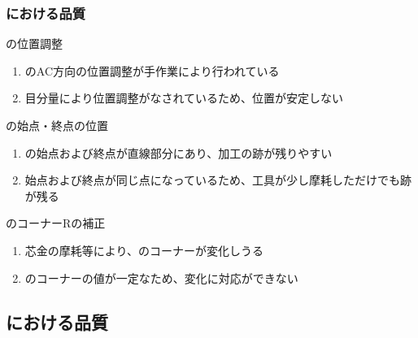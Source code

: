 \subsubsection{\EndFaceInCChamferMilling における品質}

\begin{Issues}{\EndFaceInCChamferMilling の位置調整}
\begin{enumerate}[label=\sarrow]
\item[{\sarrow[red]}]\EndFaceInCChamferMilling のAC方向の位置調整が手作業により行われている
\item[{\sarrow[red]}]目分量により位置調整がなされているため、位置が安定しない
\end{enumerate}
\end{Issues}

\begin{Issues}{\EndFaceInCChamferMilling の始点・終点の位置}
\begin{enumerate}[label=\sarrow]
\item[{\sarrow[red]}]\EndFaceInCChamferMilling の始点および終点が直線部分にあり、加工の跡が残りやすい
\item[{\sarrow[red]}]始点および終点が同じ点になっているため、工具が少し摩耗しただけでも跡が残る
\end{enumerate}
\end{Issues}

\begin{Issues}{\EndFaceInCChamferMilling のコーナーRの補正}
\begin{enumerate}[label=\sarrow]
\item{}芯金の摩耗等により、\EndFaceInCChamfer のコーナーが変化しうる
\item[{\sarrow[red]}]\EndFaceInCChamferMilling のコーナーの値が一定なため、変化に対応ができない
\end{enumerate}
\end{Issues}


\subsection{\EndFaceBoringMilling における品質}

